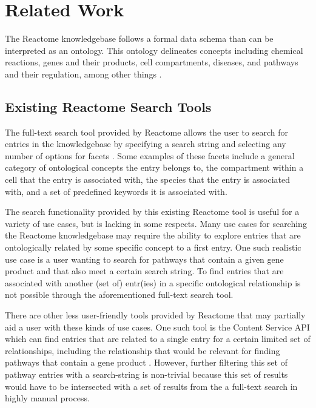\documentclass[12pt]{report}
\begin{document}
\chapter{Related Work}
The Reactome knowledgebase follows a formal data schema \cite{VastrikImre2007Rakb} than can be interpreted as an ontology. This ontology delineates concepts including chemical reactions, genes and their products, cell compartments, diseases, and pathways and their regulation, among other things \cite{DataModelGeneralDescription, GraphDatabaseDataSchema}.

\section{Existing Reactome Search Tools}
The full-text search tool provided by Reactome allows the user to search for entries in the knowledgebase by specifying a search string and selecting any number of options for facets \cite{FabregatA.2016Trpk}. Some examples of these facets include a general category of ontological concepts the entry belongs to, the compartment within a cell that the entry is associated with, the species that the entry is associated with, and a set of predefined keywords it is associated with.

The search functionality provided by this existing Reactome tool is useful for a variety of use cases, but is lacking in some respects. Many use cases for searching the Reactome knowledgebase may require the ability to explore entries that are ontologically related by some specific concept to a first entry. One such realistic use case is a user wanting to search for pathways that contain a given gene product and that also meet a certain search string. To find entries that are associated with another (set of) entr(ies) in a specific ontological relationship is not possible through the aforementioned full-text search tool.

There are other less user-friendly tools provided by Reactome that may partially aid a user with these kinds of use cases. One such tool is the Content Service API which can find entries that are related to a single entry for a certain limited set of relationships, including the relationship that would be relevant for finding pathways that contain a gene product \cite{DataModelGeneralDescription}. However, further filtering this set of pathway entries with a search-string is non-trivial because this set of results would have to be intersected with a set of results from the a full-text search in highly manual process.
\end{document}
